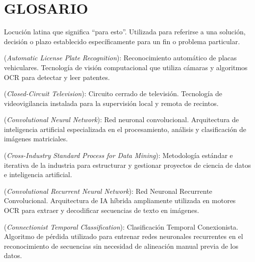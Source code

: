 
\chapter*{GLOSARIO}

\begin{description}[leftmargin=3cm, style=nextline]
    \item[ad hoc] Locución latina que significa ``para esto''. Utilizada para referirse a una solución, decisión o plazo establecido específicamente para un fin o problema particular.
    
    \item[ALPR] (\textit{Automatic License Plate Recognition}): Reconocimiento automático de placas vehiculares. Tecnología de visión computacional que utiliza cámaras y algoritmos OCR para detectar y leer patentes.
    
    \item[CCTV] (\textit{Closed-Circuit Television}): Circuito cerrado de televisión. Tecnología de videovigilancia instalada para la supervisión local y remota de recintos.
    
    \item[CNN] (\textit{Convolutional Neural Network}): Red neuronal convolucional. Arquitectura de inteligencia artificial especializada en el procesamiento, análisis y clasificación de imágenes matriciales.
    
    \item[CRISP-DM] (\textit{Cross-Industry Standard Process for Data Mining}): Metodología estándar e iterativa de la industria para estructurar y gestionar proyectos de ciencia de datos e inteligencia artificial.
    
    \item[CRNN] (\textit{Convolutional Recurrent Neural Network}): Red Neuronal Recurrente Convolucional. Arquitectura de IA híbrida ampliamente utilizada en motores OCR para extraer y decodificar secuencias de texto en imágenes.
    
    \item[CTC] (\textit{Connectionist Temporal Classification}): Clasificación Temporal Conexionista. Algoritmo de pérdida utilizado para entrenar redes neuronales recurrentes en el reconocimiento de secuencias sin necesidad de alineación manual previa de los datos.
    

\end{description}

